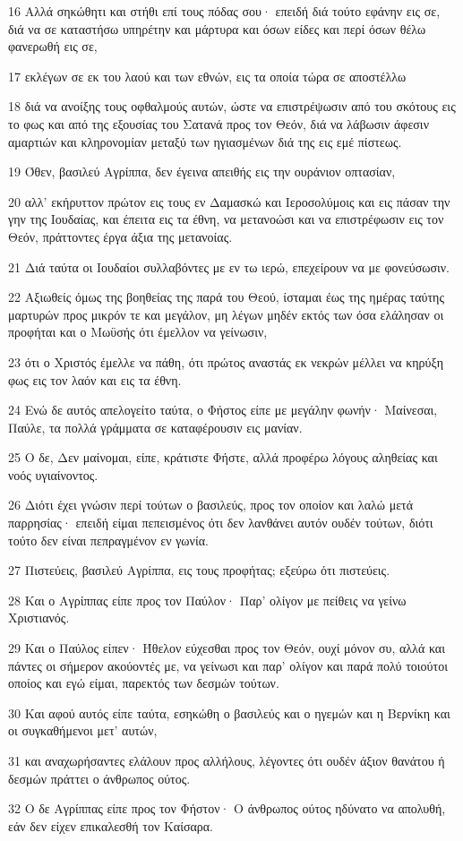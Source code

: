 \par 16 Αλλά σηκώθητι και στήθι επί τους πόδας σου· επειδή διά τούτο εφάνην εις σε, διά να σε καταστήσω υπηρέτην και μάρτυρα και όσων είδες και περί όσων θέλω φανερωθή εις σε,
\par 17 εκλέγων σε εκ του λαού και των εθνών, εις τα οποία τώρα σε αποστέλλω
\par 18 διά να ανοίξης τους οφθαλμούς αυτών, ώστε να επιστρέψωσιν από του σκότους εις το φως και από της εξουσίας του Σατανά προς τον Θεόν, διά να λάβωσιν άφεσιν αμαρτιών και κληρονομίαν μεταξύ των ηγιασμένων διά της εις εμέ πίστεως.
\par 19 Όθεν, βασιλεύ Αγρίππα, δεν έγεινα απειθής εις την ουράνιον οπτασίαν,
\par 20 αλλ' εκήρυττον πρώτον εις τους εν Δαμασκώ και Ιεροσολύμοις και εις πάσαν την γην της Ιουδαίας, και έπειτα εις τα έθνη, να μετανοώσι και να επιστρέφωσιν εις τον Θεόν, πράττοντες έργα άξια της μετανοίας.
\par 21 Διά ταύτα οι Ιουδαίοι συλλαβόντες με εν τω ιερώ, επεχείρουν να με φονεύσωσιν.
\par 22 Αξιωθείς όμως της βοηθείας της παρά του Θεού, ίσταμαι έως της ημέρας ταύτης μαρτυρών προς μικρόν τε και μεγάλον, μη λέγων μηδέν εκτός των όσα ελάλησαν οι προφήται και ο Μωϋσής ότι έμελλον να γείνωσιν,
\par 23 ότι ο Χριστός έμελλε να πάθη, ότι πρώτος αναστάς εκ νεκρών μέλλει να κηρύξη φως εις τον λαόν και εις τα έθνη.
\par 24 Ενώ δε αυτός απελογείτο ταύτα, ο Φήστος είπε με μεγάλην φωνήν· Μαίνεσαι, Παύλε, τα πολλά γράμματα σε καταφέρουσιν εις μανίαν.
\par 25 Ο δε, Δεν μαίνομαι, είπε, κράτιστε Φήστε, αλλά προφέρω λόγους αληθείας και νοός υγιαίνοντος.
\par 26 Διότι έχει γνώσιν περί τούτων ο βασιλεύς, προς τον οποίον και λαλώ μετά παρρησίας· επειδή είμαι πεπεισμένος ότι δεν λανθάνει αυτόν ουδέν τούτων, διότι τούτο δεν είναι πεπραγμένον εν γωνία.
\par 27 Πιστεύεις, βασιλεύ Αγρίππα, εις τους προφήτας; εξεύρω ότι πιστεύεις.
\par 28 Και ο Αγρίππας είπε προς τον Παύλον· Παρ' ολίγον με πείθεις να γείνω Χριστιανός.
\par 29 Και ο Παύλος είπεν· Ήθελον εύχεσθαι προς τον Θεόν, ουχί μόνον συ, αλλά και πάντες οι σήμερον ακούοντές με, να γείνωσι και παρ' ολίγον και παρά πολύ τοιούτοι οποίος και εγώ είμαι, παρεκτός των δεσμών τούτων.
\par 30 Και αφού αυτός είπε ταύτα, εσηκώθη ο βασιλεύς και ο ηγεμών και η Βερνίκη και οι συγκαθήμενοι μετ' αυτών,
\par 31 και αναχωρήσαντες ελάλουν προς αλλήλους, λέγοντες ότι ουδέν άξιον θανάτου ή δεσμών πράττει ο άνθρωπος ούτος.
\par 32 Ο δε Αγρίππας είπε προς τον Φήστον· Ο άνθρωπος ούτος ηδύνατο να απολυθή, εάν δεν είχεν επικαλεσθή τον Καίσαρα.

